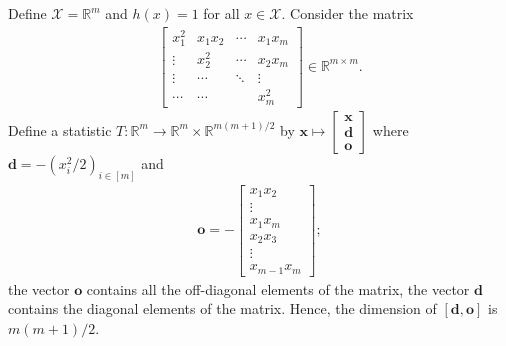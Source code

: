 \begin{eg}
  Define \( \mathcal{X} = \mathbb R^m \) and \( h(x) = 1 \) for all \( x \in \mathcal{X} \). Consider the matrix 
  \begin{align*}
    \begin{bmatrix}
      x_{1}^2 & x_{1}x_{2} & \cdots & x_{1}x_m \\
      \vdots & x_{2}^2 & \cdots & x_{2}x_m \\
      \vdots & \cdots & \ddots & \vdots \\
      \cdots & \cdots &  & x_{m}^2
    \end{bmatrix} \in \mathbb{R}^{m \times m}.
  \end{align*}
  Define a statistic \( T: \mathbb R^m \to \mathbb R^{m} \times \mathbb R^{m(m+1)/2} \) by \( \mathbf x \mapsto \begin{bmatrix}\mathbf x \\ \mathbf d \\ \mathbf o \end{bmatrix} \) where \( \mathbf d = -(x_i^2/2)_{i \in [m]} \) and
  \begin{align*}
    \mathbf o = -\begin{bmatrix}
     x_1x_2 \\ \vdots \\ x_1x_m \\ x_2 x_3 \\ \vdots \\ x_{m-1}x_m
    \end{bmatrix};
  \end{align*}
  the vector \( \mathbf o \) contains all the off-diagonal elements of the matrix, the vector \( \mathbf d \) contains the diagonal elements of the matrix. Hence, the dimension of \( [\mathbf d, \mathbf o] \) is \( m(m+1)/2 \).
  

\end{eg}
